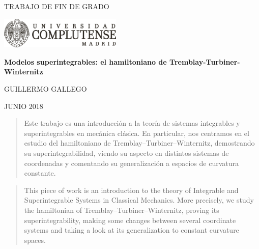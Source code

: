 \documentclass[12pt,a4paper,twoside]{article}
\theoremstyle{definition} \newtheorem{defn}[thm]{Definición}
\theoremstyle{definition} \newtheorem{ejemplo}[thm]{Ejemplo}
\theoremstyle{definition} \newtheorem{ejercicio}[thm]{Ejercicio}
\theoremstyle{remark} \newtheorem*{obs}{Observación}
\begin{document}
\begin{titlepage}
\begin{minipage}{0.5\textwidth}
  \centering
    \Large TRABAJO DE FIN DE GRADO 
  \end{minipage}
\begin{minipage}{0.5\textwidth}
  \centering
\includegraphics[height=1.5cm]{Negro-transparente}
  \end{minipage}

\vspace*{2cm}
\begin{center}

\rm \Huge\bfseries\sffamily Modelos superintegrables: el hamiltoniano de Tremblay-Turbiner-Winternitz

\vspace*{1cm}
\rm \large 
\sc GUILLERMO GALLEGO

\vspace*{.5 cm}
\sc \normalsize JUNIO 2018 \\
\end{center}

\vspace*{2cm}

\begin{abstract}
  Este trabajo es una introducción a la teoría de sistemas integrables y superintegrables en mecánica clásica. En particular, nos centramos en el estudio del hamiltoniano de Tremblay--Turbiner--Winternitz, demostrando su superintegrabilidad, viendo su aspecto en distintos sistemas de coordenadas y comentando su generalización a espacios de curvatura constante.
\end{abstract}
\begin{abstract}
 This piece of work is an introduction to the theory of Integrable and Superintegrable Systems in Classical Mechanics. More precisely, we study the hamiltonian of Tremblay--Turbiner--Winternitz, proving its superintegrability, making some changes between several coordinate systems and taking a look at its generalization to constant curvature spaces.
\end{abstract}


\end{titlepage}
\end{document}
